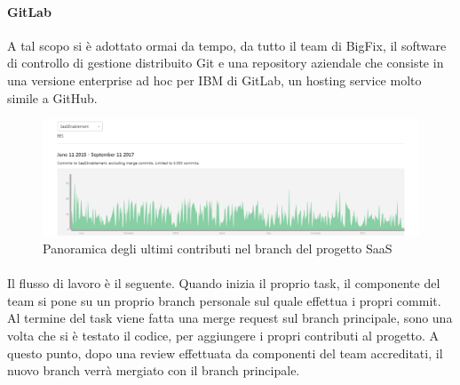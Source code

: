 \paragraph{GitLab}
A tal scopo si è adottato ormai da tempo, da tutto il team di BigFix, il software di controllo di gestione distribuito Git e una repository aziendale che consiste in una versione enterprise ad hoc per IBM di GitLab, un hosting service molto simile a GitHub. 
\begin{figure}[h!]
	\centering
	\includegraphics[width=\textwidth,keepaspectratio=true]{capitoli/imgs/GitLabGraph.PNG}
	\caption{Panoramica degli ultimi contributi nel branch del progetto SaaS}
\end{figure}
\paragraph{}
Il flusso di lavoro è il seguente. Quando inizia il proprio task, il componente del team si pone su un proprio branch personale sul quale effettua i propri commit. Al termine del task viene fatta una merge request sul branch principale, sono una volta che si è testato il codice, per aggiungere i propri contributi al progetto. A questo punto, dopo una review effettuata da componenti del team accreditati, il nuovo branch verrà mergiato con il branch principale.
